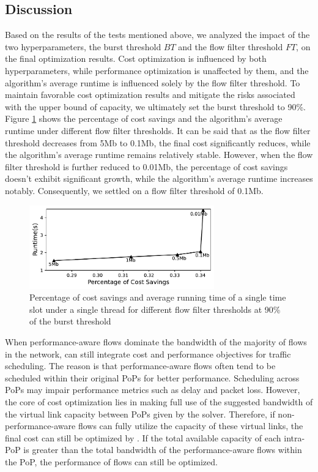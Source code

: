 \subsection{Discussion}
 Based on the results of the tests mentioned above, we analyzed the impact of the two hyperparameters, the burst threshold $BT$ and the flow filter threshold $FT$, on the final optimization results. Cost optimization is influenced by both hyperparameters, while performance optimization is unaffected by them, and the algorithm's average runtime is influenced solely by the flow filter threshold. To maintain favorable cost optimization results and mitigate the risks associated with the upper bound of {\egress} capacity, we ultimately set the burst threshold to 90\%. Figure \ref{fig:hyperChoose} shows the percentage of cost savings and the algorithm's average runtime under different flow filter thresholds. It can be said that as the flow filter threshold decreases from 5Mb to 0.1Mb, the final cost significantly reduces, while the algorithm's average runtime remains relatively stable. However, when the flow filter threshold is further reduced to 0.01Mb, the percentage of cost savings doesn't exhibit significant growth, while the algorithm's average runtime increases notably. Consequently, we settled on a flow filter threshold of 0.1Mb.

\begin{figure}
	\centering
	\includegraphics[width = 8cm]{figs/evaluation/hyperChoose.pdf}
	\caption{\small Percentage of cost savings and average running time of a single time slot under a single thread for different flow filter thresholds at 90\% of the burst threshold}
	\label{fig:hyperChoose}
\end{figure}

 When performance-aware flows dominate the bandwidth of the majority of flows in the network, {\sys} can still integrate cost and performance objectives for traffic scheduling. The reason is that performance-aware flows often tend to be scheduled within their original PoPs for better performance. Scheduling across PoPs may impair performance metrics such as delay and packet loss. However, the core of cost optimization lies in making full use of the suggested bandwidth of the virtual link capacity between PoPs given by the solver. Therefore, if non-performance-aware flows can fully utilize the capacity of these virtual links, the final cost can still be optimized by {\sys}. If the total available capacity of each intra-PoP {\egress} is greater than the total bandwidth of the performance-aware flows within the PoP, the performance of flows can still be optimized.

